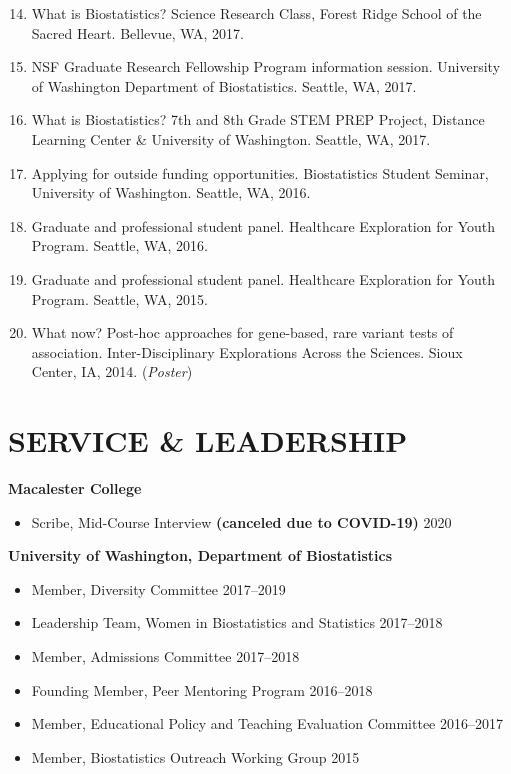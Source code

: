 \documentclass[margin]{res}
\newenvironment{benumerate}[1]{
    \let\oldItem\item
    \def\item{\addtocounter{enumi}{-2}\oldItem}
    
    \begin{enumerate}
    \setcounter{enumi}{#1}
    \addtocounter{enumi}{1}
}{
    \end{enumerate}
}
\begin{document}
\begin{resume}
\begin{benumerate}{13}
\item %
What is Biostatistics? Science Research Class, Forest Ridge School of the Sacred Heart. Bellevue, WA, 2017.

\item %
NSF Graduate Research Fellowship Program information session. University of Washington Department of Biostatistics. Seattle, WA, 2017.

\item %
What is Biostatistics? 7th and 8th Grade STEM PREP Project, Distance Learning Center \& University of Washington. Seattle, WA, 2017.

\item %
Applying for outside funding opportunities. Biostatistics Student Seminar, University of Washington. Seattle, WA, 2016.

\item Graduate and professional student panel. Healthcare Exploration for Youth Program. Seattle, WA, 2016.

\item Graduate and professional student panel. Healthcare Exploration for Youth Program. Seattle, WA, 2015.

\item %
What now? Post-hoc approaches for gene-based, rare variant tests of association. Inter-Disciplinary Explorations Across the Sciences. Sioux Center, IA, 2014.  (\textit{Poster})\\
\end{benumerate}

\section{SERVICE \& LEADERSHIP}  
\textbf{Macalester College}
	\begin{itemize} \itemsep -2pt
	\item Scribe, Mid-Course Interview \textbf{(canceled due to COVID-19)}  \hfill 2020
	\end{itemize}

\textbf{University of Washington, Department of Biostatistics}
			\begin{itemize} \itemsep -2pt
			\item Member, Diversity Committee \hfill 2017--2019
			\item Leadership Team, Women in Biostatistics and Statistics \hfill 2017--2018
			\item Member, Admissions Committee \hfill 2017--2018
			\item Founding Member, Peer Mentoring Program \hfill 2016--2018
			\item Member, Educational Policy and Teaching Evaluation Committee \hfill 2016--2017
			\item Member, Biostatistics Outreach Working Group \hfill 2015
			\end{itemize}


\end{resume}
\end{document}
